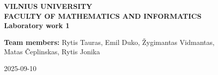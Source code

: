 \begin{titlepage}
    \begin{center}
        \textbf{VILNIUS UNIVERSITY}\\
        \textbf{FACULTY OF MATHEMATICS AND INFORMATICS}\\
        \vspace*{1cm}
        \textbf{Laboratory work 1}\\
    \end{center}
    \vspace*{5cm}
    \begin{flushright}
        \textbf{Team members:}
        Rytis Tauras, Emil Duko, Žygimantas Vidmantas,\\Matas Čeplinskas, Rytis Jonika
    \end{flushright}
    \vfill
    \begin{center}
        2025-09-10
    \end{center}
\end{titlepage}